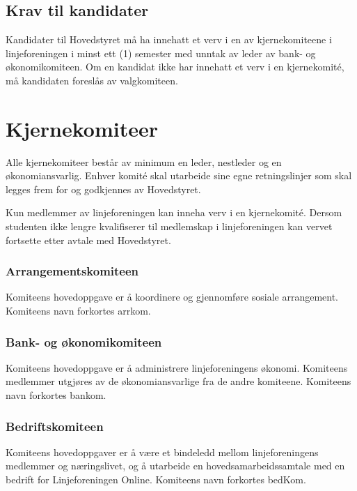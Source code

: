 \subsection{Krav til kandidater}{
Kandidater til Hovedstyret må ha innehatt et verv i en av kjernekomiteene i linjeforeningen i minst ett (1) semester med unntak av leder av bank- og økonomikomiteen. Om en kandidat ikke har innehatt et verv i en kjernekomité, må kandidaten foreslås av valgkomiteen.
}



\vspace{-23pt}
\section{Kjernekomiteer}
\label{sec:komiteer}

Alle kjernekomiteer består av minimum en leder, nestleder og en økonomiansvarlig. Enhver komité skal utarbeide sine egne retningslinjer som skal legges frem for og godkjennes av Hovedstyret. 
							
Kun medlemmer av linjeforeningen kan inneha verv i en kjernekomité. Dersom studenten ikke lengre kvalifiserer til medlemskap i linjeforeningen kan vervet fortsette etter avtale med Hovedstyret. 

\vspace{-10pt}
\subsubsection{Arrangementskomiteen}{
Komiteens hovedoppgave er å koordinere og gjennomføre sosiale arrangement. Komiteens navn forkortes arrkom.

}

\vspace{-10pt}
\subsubsection{Bank- og økonomikomiteen}{
Komiteens hovedoppgave er å administrere linjeforeningens økonomi. Komiteens medlemmer utgjøres av de økonomiansvarlige fra de andre komiteene. Komiteens navn forkortes bankom.

}

\vspace{-10pt}
\subsubsection{Bedriftskomiteen}{
Komiteens hovedoppgaver er å være et bindeledd mellom linjeforeningens medlemmer og næringslivet, og å utarbeide en hovedsamarbeidssamtale med en bedrift for Linjeforeningen Online. Komiteens navn forkortes bedKom.
}

